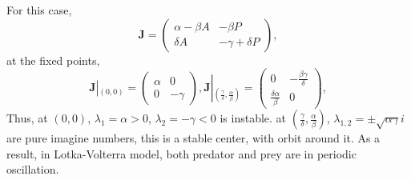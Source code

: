     For this case,
    \begin{equation*}
        \bm{J} = \begin{pmatrix}
            \alpha - \beta A & -\beta P\\
            \delta A & -\gamma + \delta P
        \end{pmatrix},
    \end{equation*}
    at the fixed points,
    \begin{equation*}
        \bm{J}\left|_{(0,0)}\right. = \begin{pmatrix}
            \alpha & 0\\
            0 & -\gamma
        \end{pmatrix},
        \bm{J}\left|_{(\frac{\gamma}{\delta},\frac{\alpha}{\beta})}\right. = \begin{pmatrix}
            0 & -\frac{\beta \gamma}{\delta}\\
            \frac{\delta \alpha}{\beta} & 0
        \end{pmatrix},
    \end{equation*}
    Thus, at $(0,0)$, $\lambda_1 = \alpha > 0$, $\lambda_2 = -\gamma <0$ is instable. at $(\frac{\gamma}{\delta},\frac{\alpha}{\beta})$, $\lambda_{1,2} = \pm \sqrt{\alpha \gamma} i$ are pure imagine numbers, this is a stable center, with orbit around it. As a result, in Lotka-Volterra model, both predator and prey are in periodic oscillation.

